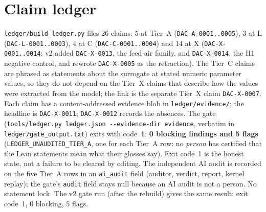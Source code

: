 \documentclass[10pt]{article}
\newcommand{\id}[1]{\texttt{DAC-#1}}
\begin{document}
\section{Claim ledger}\label{sec:ledger}
\texttt{ledger/build\_ledger.py} files $26$ claims: $5$ at Tier~A (\id{A-0001..0005}), $3$ at L (\id{L-0001..0003}), $4$ at C (\id{C-0001..0004}) and $14$ at X (\id{X-0001..0014}; v2 added \id{X-0013}, the feed-air family, and \id{X-0014}, the H1 negative control, and rewrote \id{X-0005} as the retraction). The Tier~C claims are phrased as statements about the surrogate at stated numeric parameter values, so they do not depend on the Tier~X claims that describe how the values were extracted from the model; the link is the separate Tier~X claim \id{X-0007}.
Each claim has a content-addressed evidence blob in \texttt{ledger/evidence/}; the headline is \id{X-0011}; \id{X-0012} records the absences. The gate (\texttt{tools/ledger.py ledger.json -{}-evidence-dir evidence}, verbatim in \texttt{ledger/gate\_output.txt}) exits with code~\textbf{1}: \textbf{0 blocking findings and 5 flags} (\texttt{LEDGER\_UNAUDITED\_TIER\_A}, one for each Tier~A row: no \emph{person}
has certified that the Lean statements mean what their glosses say). Exit code~1 is the honest state, not a failure to be cleared by editing. The independent AI audit is recorded on the five Tier~A rows in an \texttt{ai\_audit} field (auditor, verdict, report, kernel replay); the gate's \texttt{audit} field stays null because an AI audit is not a person. No statement lock. The v2 gate run (after the rebuild) gives the same result: exit code~1, 0 blocking, 5 flags.

\end{document}
